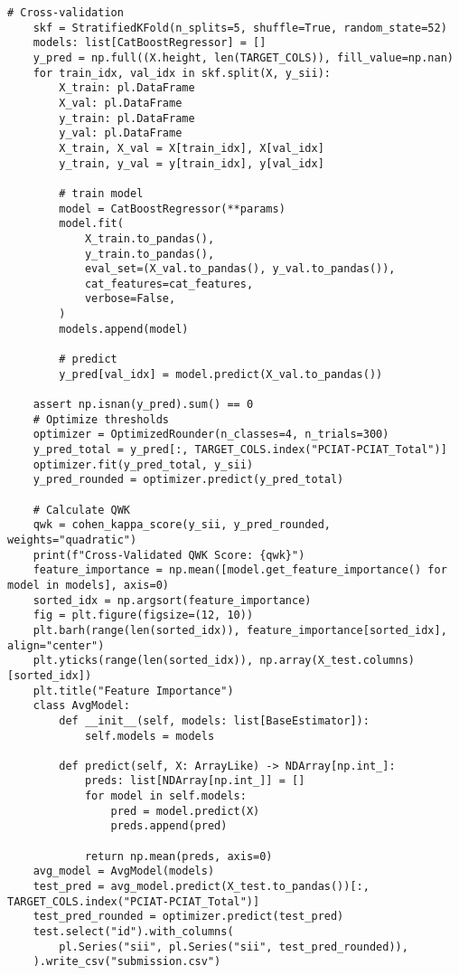 \begin{appendices}
\begin{mdframed}
\begin{lstlisting}[breaklines=true]
    # Cross-validation
    skf = StratifiedKFold(n_splits=5, shuffle=True, random_state=52)
    models: list[CatBoostRegressor] = []
    y_pred = np.full((X.height, len(TARGET_COLS)), fill_value=np.nan)
    for train_idx, val_idx in skf.split(X, y_sii):
        X_train: pl.DataFrame
        X_val: pl.DataFrame
        y_train: pl.DataFrame
        y_val: pl.DataFrame
        X_train, X_val = X[train_idx], X[val_idx]
        y_train, y_val = y[train_idx], y[val_idx]

        # train model
        model = CatBoostRegressor(**params)
        model.fit(
            X_train.to_pandas(),
            y_train.to_pandas(),
            eval_set=(X_val.to_pandas(), y_val.to_pandas()),
            cat_features=cat_features,
            verbose=False,
        )
        models.append(model)

        # predict
        y_pred[val_idx] = model.predict(X_val.to_pandas())

    assert np.isnan(y_pred).sum() == 0
    # Optimize thresholds
    optimizer = OptimizedRounder(n_classes=4, n_trials=300)
    y_pred_total = y_pred[:, TARGET_COLS.index("PCIAT-PCIAT_Total")]
    optimizer.fit(y_pred_total, y_sii)
    y_pred_rounded = optimizer.predict(y_pred_total)

    # Calculate QWK
    qwk = cohen_kappa_score(y_sii, y_pred_rounded, weights="quadratic")
    print(f"Cross-Validated QWK Score: {qwk}")
    feature_importance = np.mean([model.get_feature_importance() for model in models], axis=0)
    sorted_idx = np.argsort(feature_importance)
    fig = plt.figure(figsize=(12, 10))
    plt.barh(range(len(sorted_idx)), feature_importance[sorted_idx], align="center")
    plt.yticks(range(len(sorted_idx)), np.array(X_test.columns)[sorted_idx])
    plt.title("Feature Importance")
    class AvgModel:
        def __init__(self, models: list[BaseEstimator]):
            self.models = models

        def predict(self, X: ArrayLike) -> NDArray[np.int_]:
            preds: list[NDArray[np.int_]] = []
            for model in self.models:
                pred = model.predict(X)
                preds.append(pred)

            return np.mean(preds, axis=0)
    avg_model = AvgModel(models)
    test_pred = avg_model.predict(X_test.to_pandas())[:, TARGET_COLS.index("PCIAT-PCIAT_Total")]
    test_pred_rounded = optimizer.predict(test_pred)
    test.select("id").with_columns(
        pl.Series("sii", pl.Series("sii", test_pred_rounded)),
    ).write_csv("submission.csv")
    \end{lstlisting}
    \end{mdframed}



\end{appendices}
